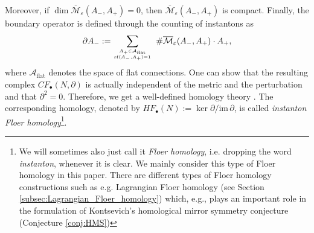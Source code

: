 \documentclass[11pt,colorinlistoftodos]{amsart}
\numberwithin{equation}{subsection}
\theoremstyle{plain}
\theoremstyle{definition}
\theoremstyle{remark}
\newcommand{\de}{\partial}
\newcommand{\calM}{\mathcal{M}}
\begin{document}
Moreover, if $\dim\overline{\calM}_\varepsilon(A_-,A_+)=0$, then $\overline{\calM}_\varepsilon(A_-,A_+)$ is compact.
Finally, the boundary operator is defined through the counting of instantons as 
\[
\de A_-:=\sum_{A_+\in \mathrm{\mathcal{A}_\mathrm{flat}}\atop\mathrm{sf}(A_-,A_+)=1}\,\,\#\overline{\calM}_\varepsilon(A_-,A_+)\cdot A_+,
\]
where $\mathcal{A}_\mathrm{flat}$ denotes the space of flat connections.
One can show that the resulting complex $CF_\bullet(N,\de)$ is actually independent of the metric and the perturbation and that $\de^2=0$. Therefore, we get a well-defined homology theory \cite{Floer1988,Donaldson2002}.
The corresponding homology, denoted by $HF_\bullet(N):=\ker \de/\mathrm{im}\, \de$, is called \emph{instanton Floer homology}\footnote{We will sometimes also just call it \emph{Floer homology}, i.e. dropping the word \emph{instanton}, whenever it is clear. We mainly consider this type of Floer homology in this paper. There are different types of Floer homology constructions such as e.g. Lagrangian Floer homology (see Section \ref{subsec:Lagrangian_Floer_homology}) which, e.g., plays an important role in the formulation of Kontsevich's homological mirror symmetry conjecture (Conjecture \ref{conj:HMS})}.
\end{document}
